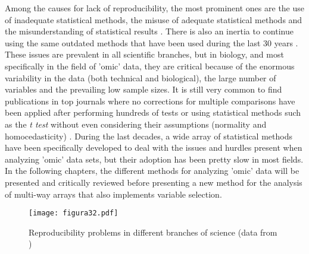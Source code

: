 Among the causes for lack of reproducibility, the most prominent ones are the use of inadequate statistical methods, the misuse of adequate statistical methods and the misunderstanding of statistical results \parencite{ioannidis2017statistical, gagnier2017misconceptions, diong2018poor}. There is also an inertia to continue using the same outdated methods that have been used during the last 30 years \parencite{leek2017five}. These issues are prevalent in all scientific branches, but in biology, and most specifically in the field of 'omic' data, they are critical because of the enormous variability in the data (both technical and biological), the large number of variables and the prevailing low sample sizes. It is still very common to find publications in top journals where no corrections for multiple comparisons have been applied after performing hundreds of tests or using statistical methods such as the \textit{t test} without even considering their assumptions (normality and homocedasticity) \parencite{marino2014use, eklund2016cluster}. During the last decades, a wide array of statistical methods have been specifically developed to deal with the issues and hurdles present when analyzing 'omic' data sets, but their adoption has been pretty slow in most fields. In the following chapters, the different methods for analyzing 'omic' data will be presented and critically reviewed before presenting a new method for the analysis of multi-way arrays that also implements variable selection.

\begin{figure}[hbtp]
	\centering
\texttt{[image: figura32.pdf]}
\caption{Reproducibility problems in different branches of science (data from \cite{baker20161})}
\label{figura32}
\end{figure}

